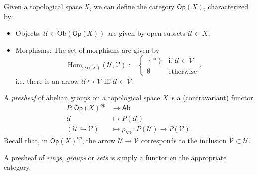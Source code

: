 \documentclass[../Main]{subfiles}
\begin{document}
\begin{rem}
	Given a topological space $X$, 
	we can define the category $\mathsf{Op}(X)$, characterized by:
	\begin{itemize}
	\item Objects: $\mathcal{U} \in \mathrm{Ob} \left(\mathsf{Op}(X)\right)$
		are given by open subsets $\mathcal{U} \subset X$,
	\item Morphisms: The set of morphisms are given by
		\begin{equation}
			\mathrm{Hom}_{\mathsf{Op}(X)} \left( \mathcal{U}, \mathcal{V} \right) :=
		\begin{cases}
			\left\{ * \right\} & \text{if } \mathcal{U} \subset \mathcal{V}\\
			\emptyset & \text{otherwise}
		\end{cases} 
		,\end{equation} 
		i.e. there is an arrow $\mathcal{U} \hookrightarrow \mathcal{V}$ iff
		$\mathcal{U} \subset \mathcal{V}$.
	\end{itemize}
\end{rem}

\begin{defn}
	A {\em presheaf} of abelian groups on a topological space $X$ is a (contravariant) functor
	\begin{align}
		P: \mathsf{Op}(X)^{op} &\longrightarrow \mathsf{Ab} \\
		\mathcal{U} &\longmapsto P(\mathcal{U}) \nonumber\\
		(\mathcal{U} \hookrightarrow \mathcal{V}) &\longmapsto \rho_{\mathcal{UV}}\colon 
		P(\mathcal{U}) \to P(\mathcal{V}) \nonumber
	.\end{align} 
	Recall that, in $\mathsf{Op}(X)^{op}$, the arrow $\mathcal{U} \to \mathcal{V}$
	corresponds to the inclusion $\mathcal{V} \subset \mathcal{U}$.
\end{defn}

\begin{defn}
	A presheaf of {\em rings, groups} or {\em sets} is simply
	a functor on the appropriate category.
\end{defn}
\end{document}
